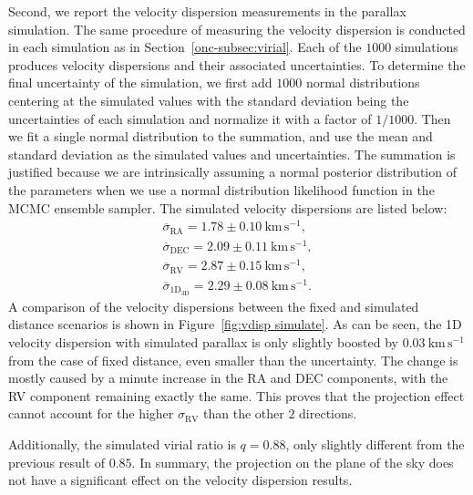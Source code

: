\documentclass[12pt]{ucsddissertation}
\begin{document}
\begin{CJK*}{UTF8}{gbsn}
Second, we report the velocity dispersion measurements in the parallax simulation. The same procedure of measuring the velocity dispersion is conducted in each simulation as in Section~\ref{onc-subsec:virial}. Each of the $1000$ simulations produces velocity dispersions and their associated uncertainties. To determine the final uncertainty of the simulation, we first add $1000$ normal distributions centering at the simulated values with the standard deviation being the uncertainties of each simulation and normalize it with a factor of $1/1000$. Then we fit a single normal distribution to the summation, and use the mean and standard deviation as the simulated values and uncertainties. The summation is justified because we are intrinsically assuming a normal posterior distribution of the parameters when we use a normal distribution likelihood function in the MCMC ensemble sampler. The simulated velocity dispersions are listed below:
\begin{align} \label{eq:vdisp simulation}
    \overline{\sigma}_\mathrm{RA} = 1.78\pm0.10~\mathrm{km}\,\mathrm{s}^{-1}, \nonumber \\
    \overline{\sigma}_\mathrm{DEC} = 2.09\pm0.11~\mathrm{km}\,\mathrm{s}^{-1}, \nonumber \\
    \overline{\sigma}_\mathrm{RV} = 2.87\pm0.15~\mathrm{km}\,\mathrm{s}^{-1}, \nonumber \\
    \overline{\sigma}_\mathrm{1D_{3D}} = 2.29\pm0.08~\mathrm{km}\,\mathrm{s}^{-1}.
\end{align}
A comparison of the velocity dispersions between the fixed and simulated distance scenarios is shown in Figure~\ref{fig:vdisp simulate}. As can be seen, the 1D velocity dispersion with simulated parallax is only slightly boosted by $0.03~\mathrm{km}\,\mathrm{s}^{-1}$ from the case of fixed distance, even smaller than the uncertainty. The change is mostly caused by a minute increase in the RA and DEC components, with the RV component remaining exactly the same. This proves that the projection effect cannot account for the higher $\sigma_\mathrm{RV}$ than the other $2$ directions. 

Additionally, the simulated virial ratio is $q=0.88$, only slightly different from the previous result of $0.85$. In summary, the projection on the plane of the sky does not have a significant effect on the velocity dispersion results.



\end{CJK*}
\end{document}
